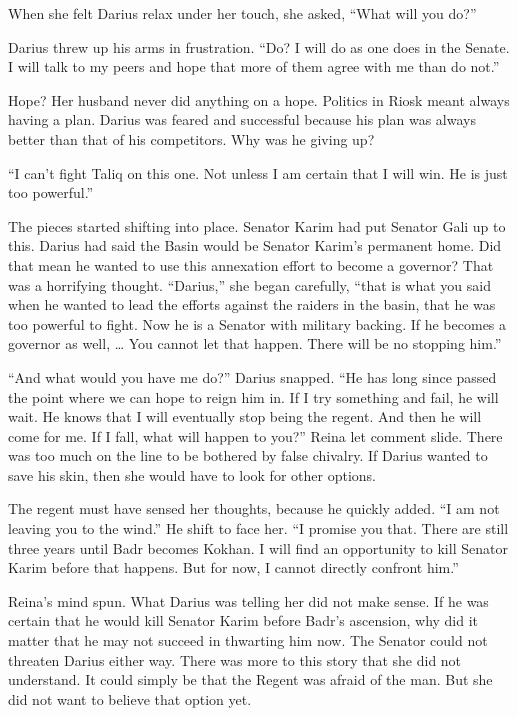 \documentclass{article}
\begin{document}
	When she felt Darius relax under her touch, she asked, “What will you do?”
	
	Darius threw up his arms in frustration. “Do? I will do as one does in the Senate. I will talk to my peers and hope that more of them agree with me than do not.” 
	
	Hope? Her husband never did anything on a hope. Politics in Riosk meant always having a plan. Darius was feared  and successful because his plan was always better than that of his competitors. Why was he giving up?
	
	“I can’t fight Taliq on this one. Not unless I am certain that I will win. He is just too powerful.” 
	
	The pieces started shifting into place. Senator Karim had put Senator Gali up to this. Darius had said the Basin would be Senator Karim’s permanent home. Did that mean he wanted to use this annexation effort to become a governor? That was a horrifying thought. “Darius,” she began carefully, “that is what you said when he wanted to lead the efforts against the raiders in the basin, that he was too powerful to fight. Now he is a Senator with military backing. If he becomes a governor as well, … You cannot let that happen. There will be no stopping him.”
	
	“And what would you have me do?” Darius snapped. “He has long since passed the point where we can hope to reign him in. If I try something and fail, he will wait. He knows that I will eventually stop being the regent. And then he will come for me. If I fall, what will happen to you?” Reina let comment slide. There was too much on the line to be bothered by false chivalry. If Darius wanted to save his skin, then she would have to look for other options. 
	
	The regent must have sensed her thoughts, because he quickly added. “I am not leaving you to the wind.” He shift to face her. “I promise you that. There are still three years until Badr becomes Kokhan. I will find an opportunity to kill Senator Karim before that happens. But for now, I cannot directly confront him.” 
	
	Reina’s mind spun. What Darius was telling her did not make sense. If he was certain that he would kill Senator Karim before Badr’s ascension, why did it matter that he may not succeed in thwarting him now. The Senator could not threaten Darius either way. There was more to this story that she did not understand. It could simply be that the Regent was afraid of the man. But she did not want to believe that option yet.
	
\end{document}
